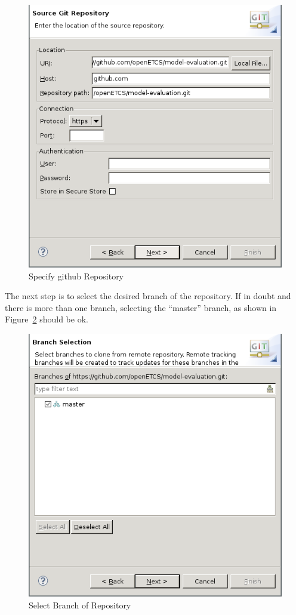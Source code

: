 \documentclass[10pt,a4paper]{article}
\newcommand{\skalierung}{.6}
\begin{document}
\begin{figure}[H]
  \centering
  \includegraphics[width=\skalierung\textwidth]{project_import_step3}
  \caption{Specify github Repository}
  \label{fig:specify-git-repo}
\end{figure}

The next step is to select the desired branch of the repository. If in doubt and
there is more than one branch, selecting the ``master'' branch, as shown in
Figure~\ref{fig:select-branch} should be ok.

\begin{figure}[H]
  \centering
  \includegraphics[width=\skalierung\textwidth]{project_import_step4}
  \caption{Select Branch of Repository}
  \label{fig:select-branch}
\end{figure}
\end{document}
